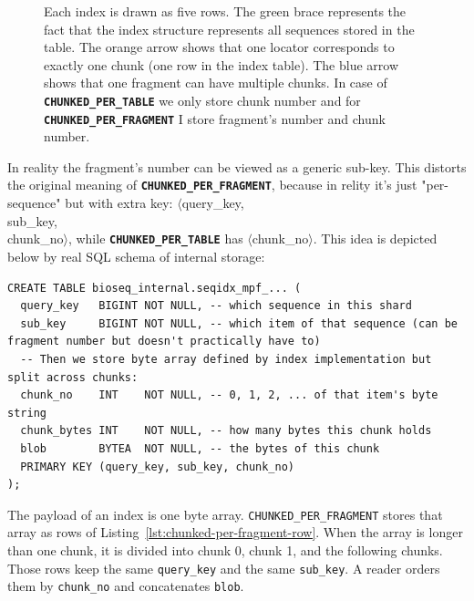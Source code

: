 \begin{figure}[htbp]
\caption[Logical concepts of the three index storage layouts]{Each index is drawn as five rows.
The green brace represents the fact that the index structure represents all sequences stored in the table.
The orange arrow shows that one locator corresponds to exactly one chunk (one row in the index table).
The blue arrow shows that one fragment can have multiple chunks.
In case of \textbf{\texttt{CHUNKED\_PER\_TABLE}} we only store chunk number and for \textbf{\texttt{CHUNKED\_PER\_FRAGMENT}} I store fragment's number and chunk number.
}
\label{fig:index-storage-layouts}
\end{figure}

In reality the fragment's number can be viewed as a generic sub-key. This distorts the original meaning of \textbf{\texttt{CHUNKED\_PER\_FRAGMENT}}, because in relity it's just 
"per-sequence" but with extra key: $\langle$query\_key,\\sub\_key,\\chunk\_no$\rangle$, while \textbf{\texttt{CHUNKED\_PER\_TABLE}} has $\langle$chunk\_no$\rangle$.
This idea is depicted below by real SQL schema of internal storage:

\begin{lstlisting}[style=bioseq-index-sql,
  caption={One heap row of a per-fragment index.},
  label={lst:chunked-per-fragment-row}]
CREATE TABLE bioseq_internal.seqidx_mpf_... (
  query_key   BIGINT NOT NULL, -- which sequence in this shard
  sub_key     BIGINT NOT NULL, -- which item of that sequence (can be fragment number but doesn't practically have to)
  -- Then we store byte array defined by index implementation but split across chunks:
  chunk_no    INT    NOT NULL, -- 0, 1, 2, ... of that item's byte string
  chunk_bytes INT    NOT NULL, -- how many bytes this chunk holds
  blob        BYTEA  NOT NULL, -- the bytes of this chunk
  PRIMARY KEY (query_key, sub_key, chunk_no)
);
\end{lstlisting}

The payload of an index is one byte array.
\texttt{CHUNKED\_PER\_FRAGMENT} stores that array as rows of Listing~\ref{lst:chunked-per-fragment-row}.
When the array is longer than one chunk, it is divided into chunk 0, chunk 1, and the following chunks.
Those rows keep the same \texttt{query\_key} and the same \texttt{sub\_key}.
A reader orders them by \texttt{chunk\_no} and concatenates \texttt{blob}.

